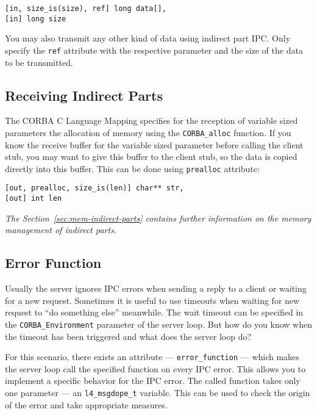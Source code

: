 \begin{verbatim}
[in, size_is(size), ref] long data[],
[in] long size
\end{verbatim}

You may also transmit any other kind of data using indirect 
part IPC. Only specify the \verb|ref| attribute with the respective
parameter and the size of the data to be transmitted. 

\subsection{Receiving Indirect Parts}
The CORBA C Language Mapping specifies for the reception of variable sized
parameters the allocation of memory using the \verb|CORBA_alloc| function.
If you know the receive buffer for the variable sized parameter before
calling the client stub, you may want to give this buffer to the client
stub, so the data is copied directly into this buffer. This can be done
using \verb|prealloc| attribute:
\begin{verbatim}
[out, prealloc, size_is(len)] char** str,
[out] int len
\end{verbatim}

{\em The Section~\ref{sec:mem-indirect-parts} contains further information
on the memory management of indirect parts.}

\subsection{Error Function}
Usually the server ignores IPC errors when sending a reply to a client or
waiting for a new request. Sometimes it is useful to use timeouts when
waiting for new request to ``do something else'' meanwhile. The wait timeout 
can be specified in the \verb|CORBA_Environment| parameter of the
server loop. But how do you know when the timeout has been triggered and
what does the server loop do?

For this scenario, there exists an attribute --- \verb|error_function| --- which
makes the server loop call the specified function on every IPC error.
This allows you to implement a specific behavior for the IPC error. The
called function takes only one parameter --- an \verb|l4_msgdope_t| variable.
This can be used to check the origin of the error and take appropriate
measures.


